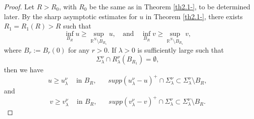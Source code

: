 \documentclass[12pt]{amsart}
\theoremstyle{definition}
\theoremstyle{remark}
\theoremstyle{conclusion}
\theoremstyle{conjecture}
\numberwithin{equation}{section}
\newcommand{\R}{\mathbb{R}}
\begin{document}
\begin{proof}
\medskip

 Let $R > R_0$, with $R_0$ be the same as in Theorem \ref{th2.1-}, to be determined later. By the sharp asymptotic estimates for $u$ in Theorem \ref{th2.1-}, there exists $R_1= R_1(R) > R$ such that
$$ \inf_{B_R} u \geq \sup_{\R^N\setminus B_{R_1}} u, \quad \mbox{and} \quad \inf_{B_R} v \geq \sup_{\R^N\setminus B_{R_1}} v,$$
where $B_{r}:=B_{r}(0)$ for any $r>0$. If $\lambda>0$ is sufficiently large such that
$$\Sigma_\lambda^\nu \cap R_\lambda^\nu(B_{R_1}) = \emptyset,$$
then we have
$$u\geq u^{\nu}_{\lambda} \quad \,\mbox{in}\,\, B_R, \,\,\quad \,\, supp(u^{\nu}_{\lambda}-u)^+\cap\Sigma^{\nu}_{\lambda}\subset \Sigma_\lambda^\nu\setminus B_R,$$
and
$$v\geq v^{\nu}_{\lambda} \quad \,\mbox{in}\,\, B_R, \,\,\quad \,\, supp(v^{\nu}_{\lambda}-v)^+\cap\Sigma^{\nu}_{\lambda}\subset \Sigma_\lambda^\nu\setminus B_R.$$


\end{proof}
\end{document}
